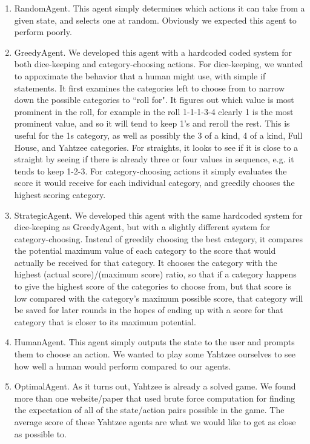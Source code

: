 \documentclass{article}
\begin{document}
\begin{enumerate}
\item{RandomAgent.}
This agent simply determines which actions it can take from a given state, and
selects one at random. Obviously we expected this agent to perform poorly.

\item{GreedyAgent.}
We developed this agent with a hardcoded coded system for both dice-keeping
and category-choosing actions. For dice-keeping, we wanted to appoximate the
behavior that a human might use, with simple if statements. It first examines
the
categories left to choose from to narrow down the possible categories to ``roll
 for". It figures out which value is most prominent in the roll, for example in
the roll 1-1-1-3-4 clearly 1 is the most prominent value, and so it will tend to
keep 1's
and reroll the rest. This is useful for the 1s category, as well as possibly the
3 of a kind, 4 of a kind, Full House, and Yahtzee categories. For straights,
it looks to see if it is close to a straight by seeing if there is already
three or four values in sequence, e.g. it tends to keep 1-2-3. For 
category-choosing actions it simply evaluates the score it would receive for
each individual category, and greedily chooses the highest scoring category.

\item{StrategicAgent.}
We developed this agent with the same hardcoded system for dice-keeping as
GreedyAgent, but with a slightly different system for category-choosing. Instead
of greedily choosing the best category, it compares the potential maximum value
of each category to the score that would actually be received for that category.
It chooses the category with the highest (actual score)/(maximum score) ratio,
so that if a category happens to give the highest score of the categories to
choose from, but that score is low
compared with the category's maximum possible score, that category will
be saved for later rounds in the hopes of ending up with a score
for that category that is closer to its maximum potential.

\item{HumanAgent.}
This agent simply outputs the state to the user and prompts them to choose an
action. We wanted to play some Yahtzee ourselves to see how well a human would
perform compared to our agents.

\item{OptimalAgent.}
As it turns out, Yahtzee is already a solved game. We found more than one
website/paper that used brute force computation for finding the
expectation of all of the state/action pairs possible in the game. The average
score of these Yahtzee agents are what we would like to get as close as
possible to.

\end{enumerate}
\end{document}
